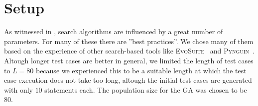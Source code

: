 \documentclass[paper=a4,%
  twoside,%
  BCOR4mm,%
  abstract=true,%
  toc=bibliography,%
  chapterprefix=true,%
  toc=bibliographynumbered,%
  open=right,%
  english,%
  pagesize=pdftex]{scrreprt}
\begin{document}

\section{Setup}
\label{sec:environment-setup}
As witnessed in , search algorithms are influenced by a great number of parameters. For many of these there are ''best practices''. We chose many of them based on the experience of other search-based tools like \textsc{EvoSuite}~\cite{Fraser_2011a} and \textsc{Pynguin}~\cite{Lukasczyk2020}. Altough longer test cases are better in general, we limited the length of test cases to $L = 80$ because we experienced this to be a suitable length at which the test case execution does not take too long, altough the initial test cases are generated with only $10$ statements each. The population size for the \ac{GA} was chosen to be $80$.
\end{document}
